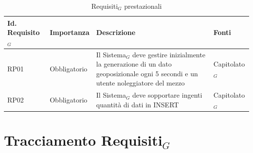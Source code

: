 \documentclass[10pt]{article}
\begin{document}
\begin{justify}
\begin{table}[H]
\centering
\renewcommand{\arraystretch}{1.5}
\begin{tabular}{|>{\centering\arraybackslash}m{2.7cm}|>{\centering\arraybackslash}m{2.7cm}|>{\centering\arraybackslash}m{6cm}|>{\centering\arraybackslash}m{2.1cm}|}
\hline
\textbf{Id. Requisito$_G$} & \textbf{Importanza} & \textbf{Descrizione} & \textbf{Fonti}\\
\hline
RP01 & Obbligatorio &  Il Sistema$_G$ deve gestire inizialmente la generazione di un dato geoposizionale ogni 5 secondi e un utente noleggiatore del mezzo & Capitolato$_G$\\
\hline
RP02 & Obbligatorio &  Il Sistema$_G$ deve sopportare ingenti quantità di dati in INSERT & Capitolato$_G$\\
\hline
\end{tabular}
\caption{Requisiti$_G$ prestazionali}
\end{table}



\newpage
\section{Tracciamento Requisiti$_G$}


\end{justify}
\end{document}
